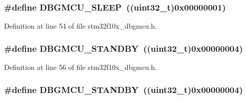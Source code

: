 \subsubsection[{\texorpdfstring{D\+B\+G\+M\+C\+U\+\_\+\+S\+L\+E\+EP}{DBGMCU_SLEEP}}]{\setlength{\rightskip}{0pt plus 5cm}\#define D\+B\+G\+M\+C\+U\+\_\+\+S\+L\+E\+EP~(({\bf uint32\+\_\+t})0x00000001)}\hypertarget{group___d_b_g_m_c_u___exported___constants_ga1c457289646b9d9814b93fbb994c9930}{}\label{group___d_b_g_m_c_u___exported___constants_ga1c457289646b9d9814b93fbb994c9930}


Definition at line 54 of file stm32f10x\+\_\+dbgmcu.\+h.

\subsubsection[{\texorpdfstring{D\+B\+G\+M\+C\+U\+\_\+\+S\+T\+A\+N\+D\+BY}{DBGMCU_STANDBY}}]{\setlength{\rightskip}{0pt plus 5cm}\#define D\+B\+G\+M\+C\+U\+\_\+\+S\+T\+A\+N\+D\+BY~(({\bf uint32\+\_\+t})0x00000004)}\hypertarget{group___d_b_g_m_c_u___exported___constants_ga6eb848845f9207ffdccd0590da192002}{}\label{group___d_b_g_m_c_u___exported___constants_ga6eb848845f9207ffdccd0590da192002}


Definition at line 56 of file stm32f10x\+\_\+dbgmcu.\+h.

\subsubsection[{\texorpdfstring{D\+B\+G\+M\+C\+U\+\_\+\+S\+T\+A\+N\+D\+BY}{DBGMCU_STANDBY}}]{\setlength{\rightskip}{0pt plus 5cm}\#define D\+B\+G\+M\+C\+U\+\_\+\+S\+T\+A\+N\+D\+BY~(({\bf uint32\+\_\+t})0x00000004)}\hypertarget{group___d_b_g_m_c_u___exported___constants_ga6eb848845f9207ffdccd0590da192002}{}\label{group___d_b_g_m_c_u___exported___constants_ga6eb848845f9207ffdccd0590da192002}


